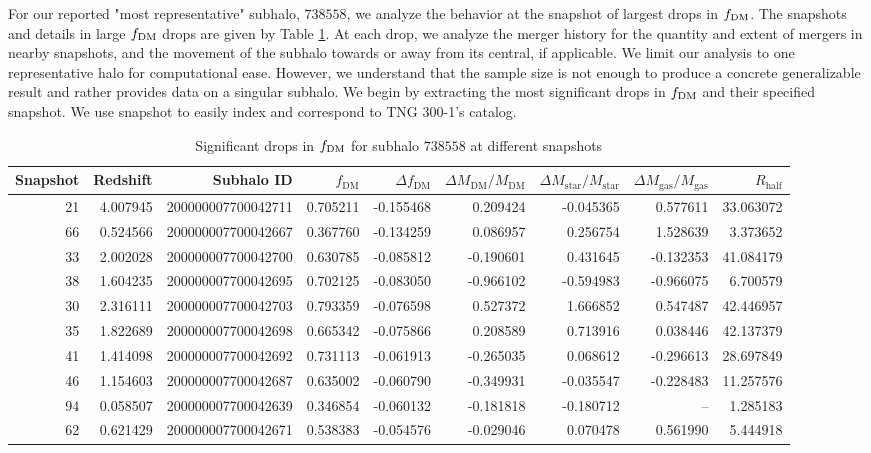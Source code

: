 \documentclass[twocolumn]{openjournal}
\begin{document}
For our reported "most representative" subhalo, $738558$, we analyze the behavior at the snapshot of largest drops in $f_\textup{DM}$. The snapshots and details in large $f_\textup{DM}$ drops are given by Table \ref{fDM drops info}. At each drop, we analyze the merger history for the quantity and extent of mergers in nearby snapshots, and the movement of the subhalo towards or away from its central, if applicable. We limit our analysis to one representative halo for computational ease. However, we understand that the sample size is not enough to produce a concrete generalizable result and rather provides data on a singular subhalo. We begin by extracting the most significant drops in $f_\textup{DM}$ and their specified snapshot. We use snapshot to easily index and correspond to TNG 300-1's catalog. 
\begin{table}[t]
\centering
\caption{Significant drops in $f_\textup{DM}$ for subhalo $738558$ at different snapshots}
\label{fDM drops info}
\small
\begin{tabular}{rrrrrrrrr}
\toprule
Snapshot & Redshift & Subhalo ID & $f_{\mathrm{DM}}$ &
$\Delta f_{\mathrm{DM}}$ &
$\Delta M_{\mathrm{DM}}/M_{\mathrm{DM}}$ &
$\Delta M_{\mathrm{star}}/M_{\mathrm{star}}$ &
$\Delta M_{\mathrm{gas}}/M_{\mathrm{gas}}$ &
$R_{\mathrm{half}}$ \\
\midrule
21 & 4.007945 & 200000007700042711 & 0.705211 & -0.155468 & 0.209424 & -0.045365 & 0.577611 & 33.063072 \\
66 & 0.524566 & 200000007700042667 & 0.367760 & -0.134259 & 0.086957 & 0.256754 & 1.528639 & 3.373652 \\
33 & 2.002028 & 200000007700042700 & 0.630785 & -0.085812 & -0.190601 & 0.431645 & -0.132353 & 41.084179 \\
38 & 1.604235 & 200000007700042695 & 0.702125 & -0.083050 & -0.966102 & -0.594983 & -0.966075 & 6.700579 \\
30 & 2.316111 & 200000007700042703 & 0.793359 & -0.076598 & 0.527372 & 1.666852 & 0.547487 & 42.446957 \\
35 & 1.822689 & 200000007700042698 & 0.665342 & -0.075866 & 0.208589 & 0.713916 & 0.038446 & 42.137379 \\
41 & 1.414098 & 200000007700042692 & 0.731113 & -0.061913 & -0.265035 & 0.068612 & -0.296613 & 28.697849 \\
46 & 1.154603 & 200000007700042687 & 0.635002 & -0.060790 & -0.349931 & -0.035547 & -0.228483 & 11.257576 \\
94 & 0.058507 & 200000007700042639 & 0.346854 & -0.060132 & -0.181818 & -0.180712 & -- & 1.285183 \\
62 & 0.621429 & 200000007700042671 & 0.538383 & -0.054576 & -0.029046 & 0.070478 & 0.561990 & 5.444918 \\
\bottomrule
\end{tabular}
\end{table}
\end{document}
